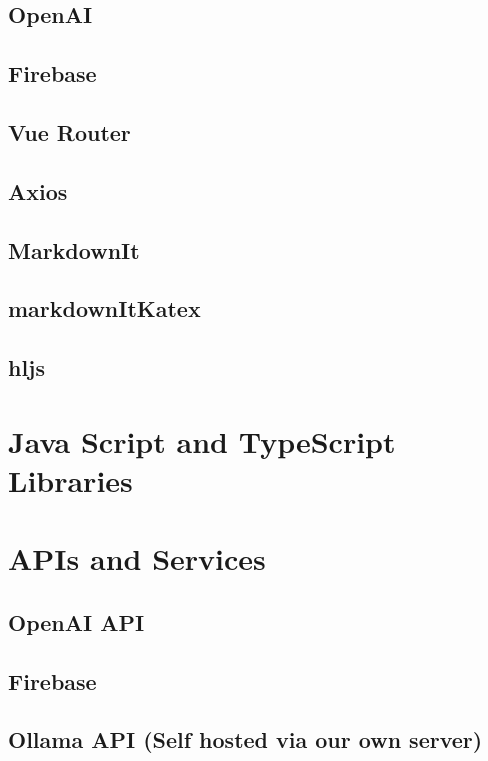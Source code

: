 \subsection{OpenAI}

\subsection{Firebase}

\subsection{Vue Router}

\subsection{Axios}

\subsection{MarkdownIt}

\subsection{markdownItKatex}

\subsection{hljs}




\section{Java Script and TypeScript Libraries}




\section{APIs and Services}

\subsection{OpenAI API}

\subsection{Firebase}

\subsection{Ollama API (Self hosted via our own server)}




